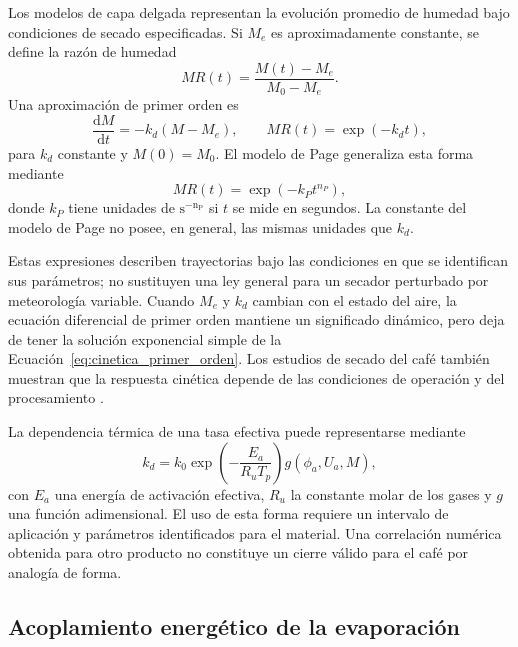 Los modelos de capa delgada representan la evolución promedio de humedad bajo condiciones de secado especificadas. Si $M_e$ es aproximadamente constante, se define la razón de humedad
\begin{equation}
MR(t)=\frac{M(t)-M_e}{M_0-M_e}.
\label{eq:moisture_ratio}
\end{equation}
Una aproximación de primer orden es
\begin{equation}
\frac{\mathrm{d}M}{\mathrm{d}t}=-k_d(M-M_e),
\qquad
MR(t)=\exp(-k_dt),
\label{eq:cinetica_primer_orden}
\end{equation}
para $k_d$ constante y $M(0)=M_0$. El modelo de Page generaliza esta forma mediante
\begin{equation}
MR(t)=\exp(-k_Pt^{n_P}),
\label{eq:modelo_page}
\end{equation}
donde $k_P$ tiene unidades de $\mathrm{s^{-n_P}}$ si $t$ se mide en segundos. La constante del modelo de Page no posee, en general, las mismas unidades que $k_d$.

Estas expresiones describen trayectorias bajo las condiciones en que se identifican sus parámetros; no sustituyen una ley general para un secador perturbado por meteorología variable. Cuando $M_e$ y $k_d$ cambian con el estado del aire, la ecuación diferencial de primer orden mantiene un significado dinámico, pero deja de tener la solución exponencial simple de la Ecuación~\eqref{eq:cinetica_primer_orden}. Los estudios de secado del café también muestran que la respuesta cinética depende de las condiciones de operación y del procesamiento \cite{alves2017}.

La dependencia térmica de una tasa efectiva puede representarse mediante
\begin{equation}
k_d=k_0\exp\left(-\frac{E_a}{R_uT_p}\right)
g(\phi_a,U_a,M),
\label{eq:arrhenius_secado}
\end{equation}
con $E_a$ una energía de activación efectiva, $R_u$ la constante molar de los gases y $g$ una función adimensional. El uso de esta forma requiere un intervalo de aplicación y parámetros identificados para el material. Una correlación numérica obtenida para otro producto no constituye un cierre válido para el café por analogía de forma.

\subsection{Acoplamiento energético de la evaporación}

